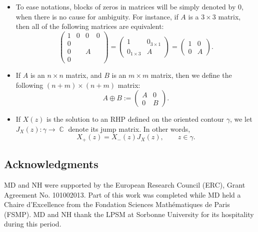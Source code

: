 \documentclass[usenames,dvipsnames]{article}
\theoremstyle{definition}
\DeclareMathOperator{\CC}{\mathbb{C}}
\numberwithin{equation}{section}
\numberwithin{figure}{section}
\begin{document}
\begin{itemize}
\begin{equation*}
\begin{pmatrix}
                1 & 0 & 0 & 0\\
                0 & 0 & 0 & 1\\
                0 & 0 & 1 & 0\\
                0 & 1 & 0 & 0
            \end{pmatrix}.
        \end{equation*}
    \item To ease notations, blocks of zeros in matrices will be simply denoted by $0$, when there is no cause for ambiguity. For instance, if 
    $A$ is a $3\times 3$ matrix, then all of the following matrices are equivalent:
    \begin{equation*}
        \begin{pmatrix}
            1 & 0 & 0 & 0\\
            0 & & & \\
            0 & & A & \\
            0 & & & 
        \end{pmatrix} = 
        \begin{pmatrix}
            1 & 0_{3\times 1}\\
            0_{1\times 3} & A
        \end{pmatrix} =
        \begin{pmatrix}
            1 & 0\\
            0 & A
        \end{pmatrix}.
    \end{equation*}
    \item If $A$ is an $n\times n$ matrix, and $B$ is an $m\times m$ matrix, then we define the following $(n+m)\times(n+m)$ matrix:
    \begin{equation*}
        A\oplus B := 
        \begin{pmatrix}
            A & 0\\
            0 & B
        \end{pmatrix}.
    \end{equation*}
    \item If $X(z)$ is the solution to an RHP defined on the oriented contour $\gamma$, we let $J_X(z) :\gamma\to \CC$ denote its jump matrix. In other words,
        \begin{equation*}
            X_+(z) = X_-(z)J_X(z),\qquad z\in \gamma.
        \end{equation*}
\end{itemize}

\subsection{Acknowledgments}
MD and NH were supported by the European Research Council (ERC), Grant Agreement No. 101002013. Part of this work was completed while MD held a Chaire d’Excellence from the Fondation Sciences Math\'{e}matiques de Paris (FSMP). MD and NH thank the LPSM at Sorbonne University for its
hospitality during this period.
\end{document}
